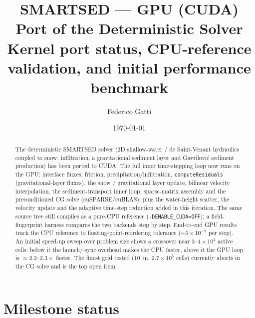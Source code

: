 \documentclass[11pt,a4paper]{article}
\title{\textbf{SMARTSED --- GPU (CUDA) Port of the Deterministic Solver}\\[2pt]
\large Kernel port status, CPU-reference validation, and initial performance benchmark}
\author{Federico Gatti}
\date{\today}
\begin{document}
\maketitle

\begin{abstract}
\noindent
The deterministic SMARTSED solver (2D shallow-water / de Saint-Venant hydraulics
coupled to snow, infiltration, a gravitational sediment layer and Gavrilovi\'c
sediment production) has been ported to CUDA. The full inner time-stepping loop
now runs on the GPU: interface fluxes, friction, precipitation/infiltration,
\texttt{computeResiduals} (gravitational-layer fluxes), the snow / gravitational
layer update, bilinear velocity interpolation, the sediment-transport inner loop,
sparse-matrix assembly and the preconditioned CG solve (cuSPARSE/cuBLAS), plus
the water-height scatter, the velocity update and the adaptive time-step
reduction added in this iteration. The same source tree still compiles as a
pure-CPU reference (\texttt{-DENABLE\_CUDA=OFF}); a field-fingerprint harness
compares the two backends step by step. End-to-end GPU results track the CPU
reference to floating-point-reordering tolerance
($\sim\!5\times10^{-7}$ per step). An initial speed-up sweep over problem size
shows a crossover near $3\text{--}4\times10^{4}$ active cells: below it the
launch/-sync overhead makes the CPU faster, above it the GPU loop is
$\approx 2.2\text{--}2.3\times$ faster. The finest grid tested ($10$~m,
$2.7\times10^{5}$ cells) currently aborts in the CG solve and is the top
open item.
\end{abstract}

\section{Milestone status}
\end{document}
